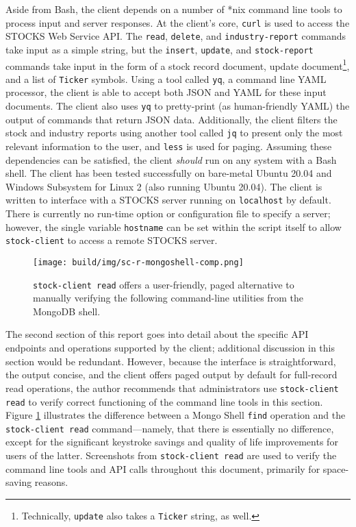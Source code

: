 \documentclass[
11pt,
titlepage,
]{article}
\begin{document}
Aside from Bash, the client depends on a number of *nix command line tools to
process input and server responses. At the client's core, \texttt{curl} is used
to access the STOCKS Web Service API. The \texttt{read}, \texttt{delete}, and
\texttt{industry-report} commands take input as a simple string, but the
\texttt{insert}, \texttt{update}, and \texttt{stock-report} commands take input
in the form of a stock record document, update document\footnote{Technically,
\texttt{update} also takes a \texttt{Ticker} string, as well.}, and a list of
\texttt{Ticker} symbols. Using a tool called \texttt{yq}, a command line YAML
processor, the client is able to accept both JSON and YAML for these input
documents. The client also uses \texttt{yq} to pretty-print (as human-friendly
YAML) the output of commands that return JSON data. Additionally, the client
filters the stock and industry reports using another tool called \texttt{jq} to
present only the most relevant information to the user, and \texttt{less} is
used for paging. Assuming these dependencies can be satisfied, the client
\textit{should} run on any system with a Bash shell. The client has been tested
successfully on bare-metal Ubuntu 20.04 and Windows Subsystem for Linux 2 (also
running Ubuntu 20.04). The client is written to interface with a STOCKS server
running on \texttt{localhost} by default. There is currently no run-time option
or configuration file to specify a server; however, the single variable
\texttt{hostname} can be set within the script itself to allow
\texttt{stock-client} to access a remote STOCKS server.

\begin{figure}[tbp]
  \texttt{[image: build/img/sc-r-mongoshell-comp.png]}
  \caption{\texttt{stock-client read} offers a user-friendly, paged alternative
    to manually verifying the following command-line utilities from the MongoDB
    shell.}
  \label{fig:sc-r-mongoshell-comp}
\end{figure}

The second section of this report goes into detail about the specific API
endpoints and operations supported by the client; additional discussion in this
section would be redundant. However, because the interface is straightforward,
the output concise, and the client offers paged output by default for
full-record read operations, the author recommends that administrators use
\texttt{stock-client read} to verify correct functioning of the command line
tools in this section. Figure \ref{fig:sc-r-mongoshell-comp} illustrates the
difference between a Mongo Shell \texttt{find} operation and the
\texttt{stock-client read} command---namely, that there is essentially no
difference, except for the significant keystroke savings and quality of life
improvements for users of the latter. Screenshots from \texttt{stock-client
read} are used to verify the command line tools and API calls throughout this
document, primarily for space-saving reasons.
\end{document}
